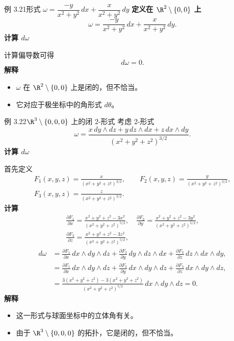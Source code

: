 \begin{statement}{例 3.21}{形式 $\omega=\dfrac{-y}{x^2+y^2}\,dx+\dfrac{x}{x^2+y^2}\,dy$}
\noindent\textbf{定义在 $\R^2\setminus\{0,0\}$ 上}
\[
  \omega=\frac{-y}{x^2+y^2}\,dx+\frac{x}{x^2+y^2}\,dy.
\]
\noindent\textbf{计算 $d\omega$}\par
计算偏导数可得
\[
  d\omega=0.
\]
\noindent\textbf{解释}
\begin{itemize}
\item $\omega$ 在 $\R^2\setminus\{0,0\}$ 上是闭的，但不恰当。
\item 它对应于极坐标中的角形式 $d\theta$。
\end{itemize}
\end{statement}

\begin{statement}{例 3.22}{$\R^3\setminus\{0,0,0\}$ 上的闭 2-形式}
考虑 2-形式
\[
  \omega=\frac{x\,dy\wedge dz+y\,dz\wedge dx+z\,dx\wedge dy}
                 {(x^2+y^2+z^2)^{3/2}}.
\]
\noindent\textbf{计算 $d\omega$}\par
首先定义
\begin{gather*}
 F_1(x,y,z)=\frac{x}{(x^2+y^2+z^2)^{3/2}},\qquad
 F_2(x,y,z)=\frac{y}{(x^2+y^2+z^2)^{3/2}},\\
 F_3(x,y,z)=\frac{z}{(x^2+y^2+z^2)^{3/2}}.
\end{gather*}
\noindent\textbf{计算}
\begin{gather*}
 \frac{\partial F_1}{\partial x}
 =\frac{x^2+y^2+z^2-3x^2}{(x^2+y^2+z^2)^{5/2}},\quad
 \frac{\partial F_2}{\partial y}
 =\frac{x^2+y^2+z^2-3y^2}{(x^2+y^2+z^2)^{5/2}},\\
 \frac{\partial F_3}{\partial z}
 =\frac{x^2+y^2+z^2-3z^2}{(x^2+y^2+z^2)^{5/2}},
\end{gather*}
\begin{align*}
 d\omega
   &=\frac{\partial F_1}{\partial x}\,dx\wedge dy\wedge dz
    +\frac{\partial F_2}{\partial y}\,dy\wedge dz\wedge dx
    +\frac{\partial F_3}{\partial z}\,dz\wedge dx\wedge dy,\\
   &=\frac{\partial F_1}{\partial x}\,dx\wedge dy\wedge dz
    +\frac{\partial F_2}{\partial y}\,dx\wedge dy\wedge dz
    +\frac{\partial F_3}{\partial z}\,dx\wedge dy\wedge dz,\\
   &=\frac{3(x^2+y^2+z^2)-3(x^2+y^2+z^2)}
           {(x^2+y^2+z^2)^{5/2}}\,dx\wedge dy\wedge dz=0.
\end{align*}
\noindent\textbf{解释}
\begin{itemize}
\item 这一形式与球面坐标中的立体角有关。
\item 由于 $\R^3\setminus\{0,0,0\}$ 的拓扑，它是闭的，但不恰当。
\end{itemize}
\end{statement}

